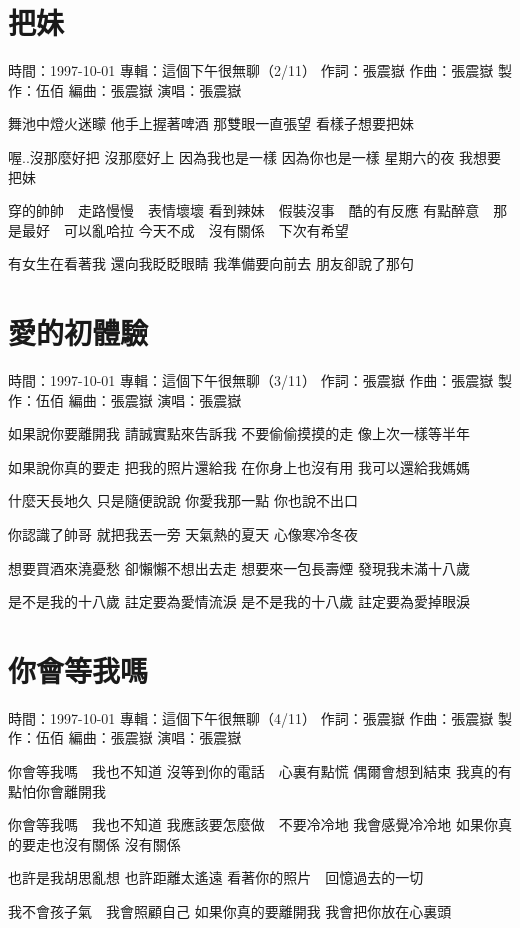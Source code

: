\documentclass[UTF8,a4paper,oneside,twocolumn,12pt]{ctexbook}
\newcommand{\infopair}[2]{\textbullet #1：#2}
\newcommand{\zc}[1][伍佰]{\infopair{作詞}{#1}}
\newcommand{\zq}[1][伍佰]{\infopair{作曲}{#1}}
\newcommand{\bq}[1][伍佰]{\infopair{編曲}{#1}}
\newcommand{\zj}[1]{\infopair{專輯}{#1}}
\newcommand{\zz}[1]{\infopair{製作}{#1}}
\newcommand{\sj}[1]{\infopair{時間}{#1}}
\newenvironment{info}{\begin{flushleft}\kaishu
	}
	{\end{flushleft}\normalsize\yahei\par}
\newenvironment{lyric}{
	}
{}
\begin{document}
\section{把妹}
\begin{info}
	\sj{1997-10-01}
	\zj{這個下午很無聊（2/11）}
	\zc[張震嶽]
	\zq[張震嶽]
	\zz{伍佰}
	\bq[張震嶽]
	\infopair{演唱}{張震嶽}
\end{info}
\begin{lyric}
	舞池中燈火迷矇 他手上握著啤酒
	那雙眼一直張望 看樣子想要把妹

	喔..沒那麼好把 沒那麼好上
	因為我也是一樣 因為你也是一樣
	星期六的夜 我想要把妹

	穿的帥帥　走路慢慢　表情壞壞
	看到辣妹　假裝沒事　酷的有反應
	有點醉意　那是最好　可以亂哈拉
	今天不成　沒有關係　下次有希望

	有女生在看著我 還向我眨眨眼睛
	我準備要向前去 朋友卻說了那句
\end{lyric}

\section{愛的初體驗}
\begin{info}
	\sj{1997-10-01}
	\zj{這個下午很無聊（3/11）}
	\zc[張震嶽]
	\zq[張震嶽]
	\zz{伍佰}
	\bq[張震嶽]
	\infopair{演唱}{張震嶽}
\end{info}
\begin{lyric}
	如果說你要離開我
	請誠實點來告訴我
	不要偷偷摸摸的走
	像上次一樣等半年

	如果說你真的要走
	把我的照片還給我
	在你身上也沒有用
	我可以還給我媽媽

	什麼天長地久
	只是隨便說說
	你愛我那一點
	你也說不出口

	你認識了帥哥
	就把我丟一旁
	天氣熱的夏天
	心像寒冷冬夜

	想要買酒來澆憂愁
	卻懶懶不想出去走
	想要來一包長壽煙
	發現我未滿十八歲

	是不是我的十八歲
	註定要為愛情流淚
	是不是我的十八歲
	註定要為愛掉眼淚
\end{lyric}

\section{你會等我嗎}
\begin{info}
	\sj{1997-10-01}
	\zj{這個下午很無聊（4/11）}
	\zc[張震嶽]
	\zq[張震嶽]
	\zz{伍佰}
	\bq[張震嶽]
	\infopair{演唱}{張震嶽}
\end{info}
\begin{lyric}
	你會等我嗎　我也不知道
	沒等到你的電話　心裏有點慌
	偶爾會想到結束 我真的有點怕你會離開我

	你會等我嗎　我也不知道
	我應該要怎麼做　不要冷冷地
	我會感覺冷冷地 如果你真的要走也沒有關係
	沒有關係

	也許是我胡思亂想 也許距離太遙遠
	看著你的照片　回憶過去的一切

	我不會孩子氣　我會照顧自己
	如果你真的要離開我
	我會把你放在心裏頭
\end{lyric}
\end{document}
